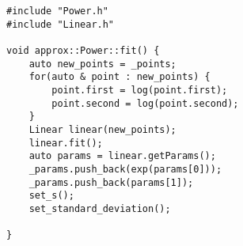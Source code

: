 \begin{lstlisting}
#include "Power.h"
#include "Linear.h"

void approx::Power::fit() {
    auto new_points = _points;
    for(auto & point : new_points) {
        point.first = log(point.first);
        point.second = log(point.second);
    }
    Linear linear(new_points);
    linear.fit();
    auto params = linear.getParams();
    _params.push_back(exp(params[0]));
    _params.push_back(params[1]);
    set_s();
    set_standard_deviation();

}

\end{lstlisting}